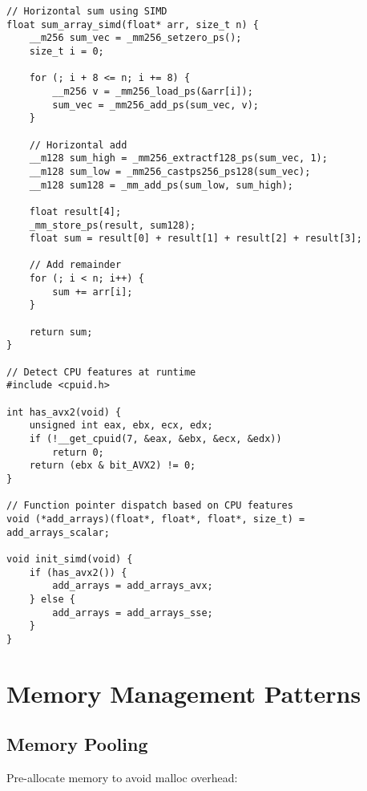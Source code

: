\begin{lstlisting}
// Horizontal sum using SIMD
float sum_array_simd(float* arr, size_t n) {
    __m256 sum_vec = _mm256_setzero_ps();
    size_t i = 0;

    for (; i + 8 <= n; i += 8) {
        __m256 v = _mm256_load_ps(&arr[i]);
        sum_vec = _mm256_add_ps(sum_vec, v);
    }

    // Horizontal add
    __m128 sum_high = _mm256_extractf128_ps(sum_vec, 1);
    __m128 sum_low = _mm256_castps256_ps128(sum_vec);
    __m128 sum128 = _mm_add_ps(sum_low, sum_high);

    float result[4];
    _mm_store_ps(result, sum128);
    float sum = result[0] + result[1] + result[2] + result[3];

    // Add remainder
    for (; i < n; i++) {
        sum += arr[i];
    }

    return sum;
}

// Detect CPU features at runtime
#include <cpuid.h>

int has_avx2(void) {
    unsigned int eax, ebx, ecx, edx;
    if (!__get_cpuid(7, &eax, &ebx, &ecx, &edx))
        return 0;
    return (ebx & bit_AVX2) != 0;
}

// Function pointer dispatch based on CPU features
void (*add_arrays)(float*, float*, float*, size_t) = add_arrays_scalar;

void init_simd(void) {
    if (has_avx2()) {
        add_arrays = add_arrays_avx;
    } else {
        add_arrays = add_arrays_sse;
    }
}
\end{lstlisting}

\section{Memory Management Patterns}

\subsection{Memory Pooling}

Pre-allocate memory to avoid malloc overhead:

